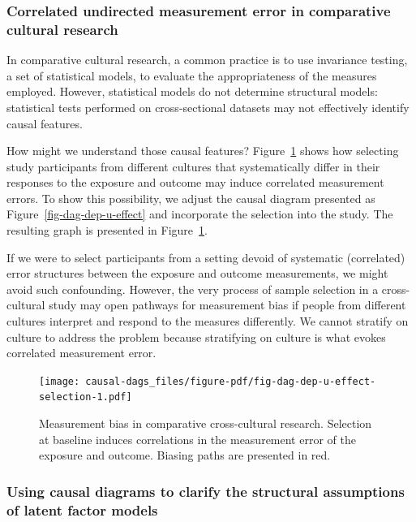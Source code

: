 \documentclass[
  singlecolumn]{article}
\begin{document}
\hypertarget{correlated-undirected-measurement-error-in-comparative-cultural-research}{%
\subsubsection{Correlated undirected measurement error in comparative
cultural
research}\label{correlated-undirected-measurement-error-in-comparative-cultural-research}}

In comparative cultural research, a common practice is to use invariance
testing, a set of statistical models, to evaluate the appropriateness of
the measures employed. However, statistical models do not determine
structural models: statistical tests performed on cross-sectional
datasets may not effectively identify causal features.

How might we understand those causal features?
Figure~\ref{fig-dag-dep-u-effect-selection} shows how selecting study
participants from different cultures that systematically differ in their
responses to the exposure and outcome may induce correlated measurement
errors. To show this possibility, we adjust the causal diagram presented
as Figure~\ref{fig-dag-dep-u-effect} and incorporate the selection into
the study. The resulting graph is presented in
Figure~\ref{fig-dag-dep-u-effect-selection}.

If we were to select participants from a setting devoid of systematic
(correlated) error structures between the exposure and outcome
measurements, we might avoid such confounding. However, the very process
of sample selection in a cross-cultural study may open pathways for
measurement bias if people from different cultures interpret and respond
to the measures differently. We cannot stratify on culture to address
the problem because stratifying on culture is what evokes correlated
measurement error.

\begin{figure}

{\centering \texttt{[image: causal-dags\_files/figure-pdf/fig-dag-dep-u-effect-selection-1.pdf]}

}

\caption{\label{fig-dag-dep-u-effect-selection}Measurement bias in
comparative cross-cultural research. Selection at baseline induces
correlations in the measurement error of the exposure and outcome.
Biasing paths are presented in red.}

\end{figure}

\hypertarget{using-causal-diagrams-to-clarify-the-structural-assumptions-of-latent-factor-models}{%
\subsubsection{Using causal diagrams to clarify the structural
assumptions of latent factor
models}\label{using-causal-diagrams-to-clarify-the-structural-assumptions-of-latent-factor-models}}
\end{document}
